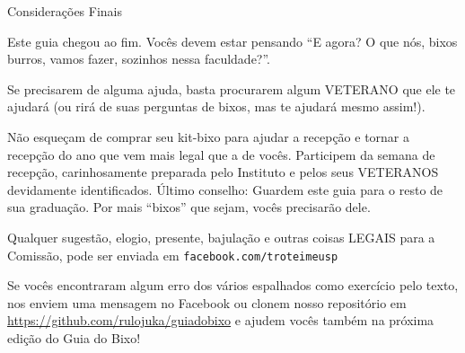 \begin{secao}{Considerações Finais}

Este guia chegou ao fim. Vocês devem estar pensando ``E agora? O que nós, bixos
burros, vamos fazer, sozinhos nessa faculdade?''.

Se precisarem de alguma ajuda, basta procurarem algum VETERANO que ele te
ajudará (ou rirá de suas perguntas de bixos, mas te ajudará mesmo assim!).

Não esqueçam de comprar seu kit-bixo para ajudar a recepção e tornar a recepção
do ano que vem mais legal que a de vocês. Participem da semana de recepção,
carinhosamente preparada pelo Instituto e pelos seus VETERANOS devidamente
identificados. Último conselho: Guardem este guia para o resto de sua graduação.
Por mais ``bixos'' que sejam, vocês precisarão dele.

Qualquer sugestão, elogio, presente, bajulação e outras coisas LEGAIS para a
Comissão, pode ser enviada em {\tt facebook.com/troteimeusp}

Se vocês encontraram algum erro dos vários espalhados como exercício pelo texto,
nos enviem uma mensagem no Facebook ou clonem nosso repositório em
\url{https://github.com/rulojuka/guiadobixo} e ajudem vocês também na próxima
edição do Guia do Bixo!

\end{secao}
